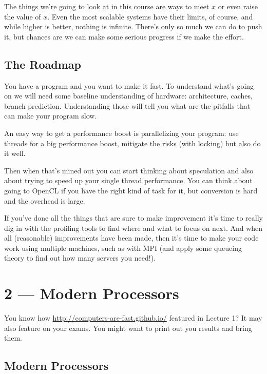 \documentclass[a4paper]{report}
\begin{document}
The things we're going to look at in this course are ways to meet $x$ or even raise the value of $x$. Even the most scalable systems have their limits, of course, and while higher is better, nothing is infinite. There's only so much we can do to push it, but chances are we can make some serious progress if we make the effort.

\section*{The Roadmap}
You have a program and you want to make it fast. To understand what's going on we will need some baseline understanding of hardware: architecture, caches, branch prediction. Understanding those will tell you what are the pitfalls that can make your program slow.

An easy way to get a performance boost is parallelizing your program: use threads for a big performance boost, mitigate the risks (with locking) but also do it well. 

Then when that's mined out you can start thinking about speculation and also about trying to speed up your single thread performance. You can think about going to OpenCL if you have the right kind of task for it, but conversion is hard and the overhead is large. 

If you've done all the things that are sure to make improvement it's time to really dig in with the profiling tools to find where and what to focus on next. And when all (reasonable) improvements have been made, then it's time to make your code work using multiple machines, such as with MPI (and apply some queueing theory to find out how many servers you need!).









\chapter*{2 --- Modern Processors}


You know how \url{http://computers-are-fast.github.io/} featured in Lecture 1? It may also feature on your exams. You might want to print out you results and bring them.

\section*{Modern Processors}
\end{document}
